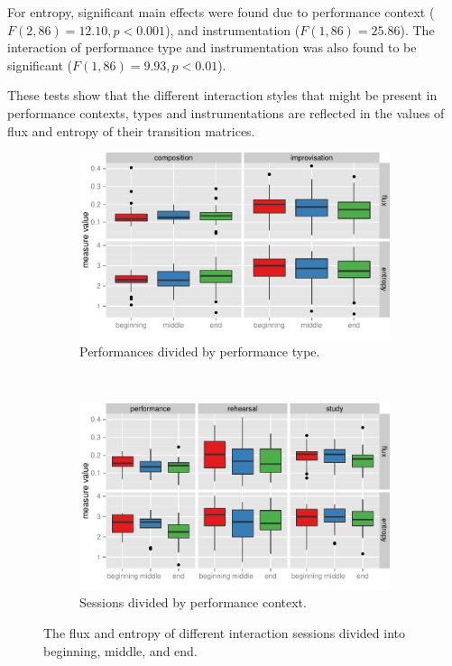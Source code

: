 \documentclass{sigchi}
\begin{document}
For entropy, significant main effects were found due to performance
context ($F(2,86) = 12.10, p < 0.001$), and instrumentation
($F(1,86) = 25.86$). The interaction of performance type and
instrumentation was also found to be significant
($F(1,86) = 9.93, p<0.01$).

These tests show that the different interaction styles that might be
present in performance contexts, types and instrumentations are
reflected in the values of flux and entropy of their transition
matrices.

\begin{figure}[t!]
    \centering
    \begin{subfigure}[t]{0.5\linewidth}
        \centering
          \includegraphics[width=\linewidth]{figures/type-section-flux-entropy}
          \caption{Performances divided by performance type. \label{fig:type-section-flux-entropy}}
    \end{subfigure}%
    ~ 
    \begin{subfigure}[t]{0.5\linewidth}
        \centering
          \includegraphics[width=\linewidth]{figures/context-section-flux-entropy}
          \caption{Sessions divided by performance context. \label{fig:context-section-flux-entropy}}
    \end{subfigure}
    \caption{The flux and entropy of different interaction sessions
      divided into beginning, middle, and end.}
\end{figure}
\end{document}
